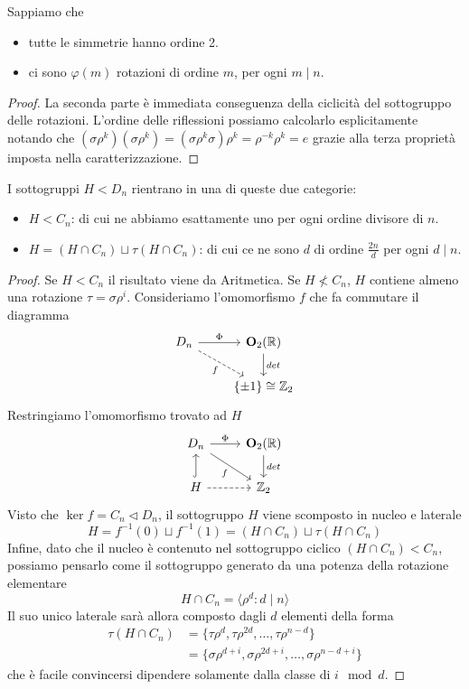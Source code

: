 \begin{multicols}{2}
\begin{prop}
	Sappiamo che
	\begin{itemize}
		\item tutte le simmetrie hanno ordine 2.
		\item ci sono $ \varphi(m) $ rotazioni di ordine $ m $, per ogni $ m \mid n $.
	\end{itemize}
\end{prop}
\begin{proof}
	La seconda parte è immediata conseguenza della ciclicità del sottogruppo delle rotazioni.
	L'ordine delle riflessioni possiamo calcolarlo esplicitamente notando che $ \left(\sigma\rho^k\right)\left(\sigma\rho^k\right) = \left(\sigma\rho^k\sigma\right)\rho^k = \rho^{-k}\rho^{k} = e $ grazie alla terza proprietà imposta nella caratterizzazione.
\end{proof}
\columnbreak
\begin{prop}[Sottogruppi di $ D_n $]
	I sottogruppi $ H < D_n $ rientrano in una di queste due categorie:
	\begin{itemize}
		\item $ H < C_n $: di cui ne abbiamo esattamente uno per ogni ordine divisore di $ n $.
		\item $ H = (H \cap C_n) \sqcup \tau(H\cap C_n) $: di cui ce ne sono $ d $ di ordine $ \frac{2n}{d} $ per ogni $ d \mid n $.
	\end{itemize}
\end{prop}
\begin{proof}
	Se $ H < C_n $ il risultato viene da Aritmetica. Se $ H \nless C_n $, $ H $ contiene almeno una rotazione $ \tau = \sigma\rho^i $. Consideriamo l'omomorfismo $ f $ che fa commutare il diagramma
	\[ \begin{tikzcd}
	D_n \arrow{r}{\Phi} \arrow[swap, dashed]{dr}{f} & \mathbf{O}_2(\mathbb{R}) \arrow{d}{det} \\
	& \{\pm 1\} \cong \mathbb{Z}_2	\end{tikzcd}
	\]
	Restringiamo l'omomorfismo trovato ad $ H $
	\[ \begin{tikzcd}
	D_n \arrow{r}{\Phi} \arrow[swap]{dr}{f} & \mathbf{O}_2(\mathbb{R}) \arrow{d}{det} \\
	H \arrow[dashed]{r}{} \arrow[swap, hook]{u}{} & \mathbb{Z}_2	\end{tikzcd}
	\]
	Visto che $ \ker f = C_n \lhd D_n $, il sottogruppo $ H $ viene scomposto in nucleo e laterale
	\[ H = f^{-1}(0) \sqcup f^{-1}(1) = (H \cap C_n) \sqcup \tau (H\cap C_n) \]
	Infine, dato che il nucleo è contenuto nel sottogruppo ciclico $ (H \cap C_n) < C_n $, possiamo pensarlo come il sottogruppo generato da una potenza della rotazione elementare \[ H \cap C_n = \langle \rho^d \colon d \mid n \rangle \] Il suo unico laterale sarà allora composto dagli $ d $ elementi della forma  \begin{align*}\tau(H\cap C_n) &=  \{\tau\rho^d, \tau\rho^{2d}, \dots, \tau\rho^{n-d} \} \\ &= \{\sigma\rho^{d+i}, \sigma\rho^{2d+i}, \dots, \sigma\rho^{n-d +i} \}\end{align*}  che è facile convincersi dipendere solamente dalla classe di $ i \mod d $.

\end{proof}
\end{multicols}
